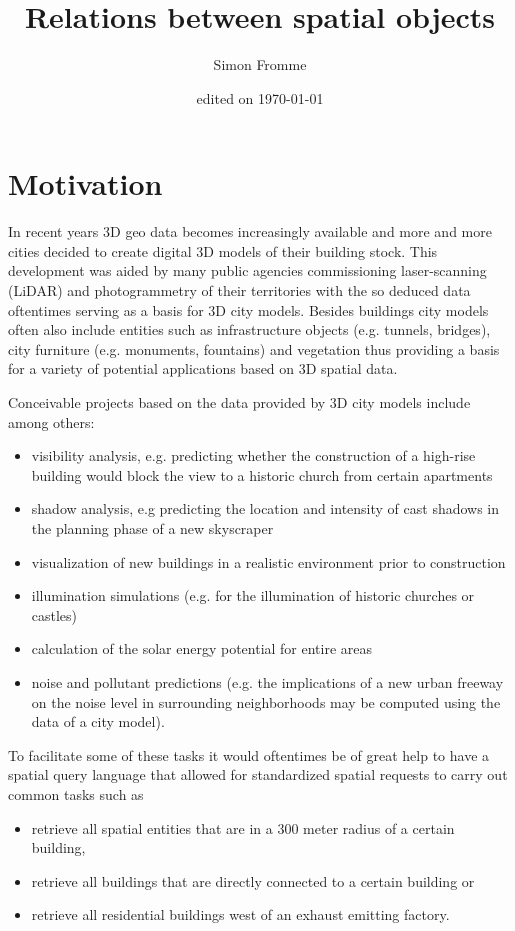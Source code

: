 \documentclass[paper=a4, fontsize=11pt]{scrartcl} %
\title{Relations between spatial objects}
\author{Simon Fromme}
\date{\normalsize edited on \today}
\numberwithin{equation}{section} %
\numberwithin{figure}{section} %
\numberwithin{table}{section} %
\begin{document}
\maketitle
\newpage
\tableofcontents
\newpage

\section{Motivation}
In recent years 3D geo data becomes increasingly available and more and more cities decided to create digital 3D models of their building stock. This development was aided by many public agencies commissioning laser-scanning (LiDAR) and photogrammetry of their territories with the so deduced data oftentimes serving as a basis for 3D city models. Besides buildings city models often also include entities such as infrastructure objects (e.g. tunnels, bridges), city furniture (e.g. monuments, fountains) and vegetation thus providing a basis for a variety of potential applications based on 3D spatial data.

Conceivable projects based on the data provided by 3D city models include among others:
\begin{itemize}
\item visibility analysis, e.g. predicting whether the construction of a high-rise building would block the view to a historic church from certain apartments
\item shadow analysis, e.g predicting the location and intensity of cast shadows in the planning phase of a new skyscraper
\item visualization of new buildings in a realistic environment prior to construction
\item illumination simulations (e.g. for the illumination of historic churches or castles)
\item calculation of the solar energy potential for entire areas
\item noise and pollutant predictions (e.g. the implications of a new urban freeway on the noise level in surrounding neighborhoods may be computed using the data of a city model).
\end{itemize}

To facilitate some of these tasks it would oftentimes be of great help to have a spatial query language that allowed for standardized spatial requests to carry out common tasks such as
\begin{itemize}
\item retrieve all spatial entities that are in a 300 meter radius of a certain building,
\item retrieve all buildings that are directly connected to a certain building or
\item retrieve all residential buildings west of an exhaust emitting factory.
\end{itemize}
\end{document}

